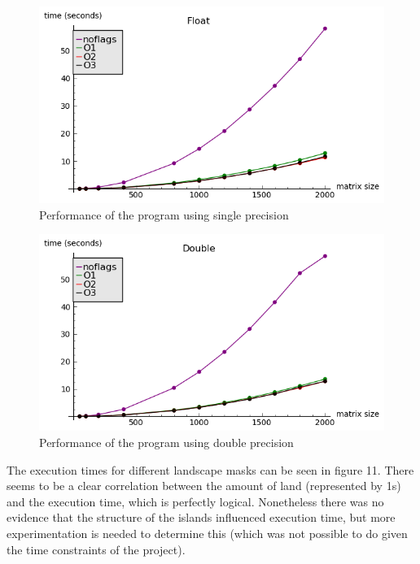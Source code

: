 \documentclass[12pt,a4paper]{article}
\begin{document}
\begin{figure}[hb]
    \centering
    \includegraphics[scale=0.6]{images/float.png}
    \caption{Performance of the program using single precision}
\end{figure}

\begin{figure}[hb]
    \centering
    \includegraphics[scale=0.6]{images/double.png}
    \caption{Performance of the program using double precision}
\end{figure}



The execution times for different landscape masks can be seen in figure 11. There seems to be a clear correlation between the amount of land (represented by 1s) and the execution time, which is perfectly logical. Nonetheless there was no evidence that the structure of the islands influenced execution time, but more experimentation is needed to determine this (which was not possible to do given the time constraints of the project).
\end{document}
